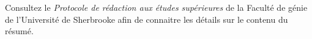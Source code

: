 Consultez le \textit{Protocole de rédaction aux études supérieures} de la Faculté de génie de l'Université de Sherbrooke afin de connaitre les détails sur le contenu du résumé.
